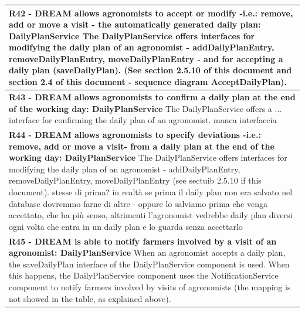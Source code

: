 \documentclass{article}
\begin{document}
\begin{longtable}[c]{|m{11.75cm}|}
    \textbf{R42 - DREAM allows agronomists to accept or modify -i.e.: remove, add or move a visit - the automatically generated daily plan: DailyPlanService}
    \newline\newline
    The DailyPlanService offers interfaces for modifying the daily plan of an agronomist - addDailyPlanEntry, removeDailyPlanEntry, moveDailyPlanEntry - and for accepting a daily plan (saveDailyPlan). (See section 2.5.10 of this document and section 2.4 of this document - sequence diagram AcceptDailyPlan).\\
    \hline
    
    \textbf{R43 - DREAM allows agronomists to confirm a daily plan at the end of the working day: DailyPlanService}
    \newline\newline
    The DailyPlanService offers a ... interface for confirming the daily plan of an agronomist.
    \color{red}
    manca interfaccia
    \color{black} \\
    \hline
    
    \textbf{R44 - DREAM allows agronomists to specify deviations -i.e.: remove, add or move a visit- from a daily plan at the end of the working day: DailyPlanService}
    \newline\newline
    The DailyPlanService offers interfaces for modifying the daily plan of an agronomist - addDailyPlanEntry, removeDailyPlanEntry, moveDailyPlanEntry (see sectuib 2.5.10 if this document).
    \color{red}
    stesse di prima? in realtà se prima il daily plan non era salvato nel database dovremmo farne di altre - oppure lo salviamo prima che venga accettato, che ha più senso, altrimenti l'agronomist vedrebbe daily plan diversi ogni volta che entra in un daily plan e lo guarda senza accettarlo
    \color{black} \\
    \hline
    
    \textbf{R45 - DREAM is able to notify farmers involved by a visit of an agronomist: DailyPlanService}
    \newline\newline
    When an agronomist accepts a daily plan, the saveDailyPlan interface of the DailyPlanService component is used. When this happens, the DailyPlanService component uses the NotificationService component to notify farmers involved by visits of agronomists (the mapping is not showed in the table, as explained above). \\
    \hline
    

\end{longtable}
\end{document}
